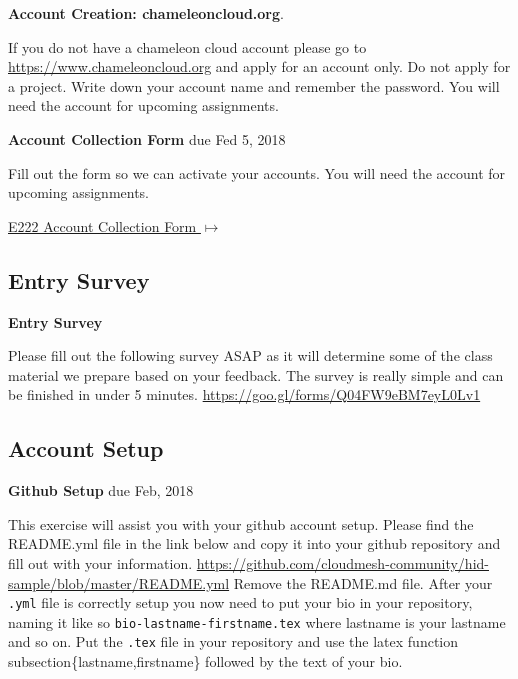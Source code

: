 \begin{exercise}
  {\bf Account Creation: chameleoncloud.org}. 
  
  If you do not have a chameleon cloud account please go to 
  \url{https://www.chameleoncloud.org} and apply for an
  account only. Do not apply for a project. Write down your account
  name and remember the password. You will need the account for
  upcoming assignments.
\end{exercise}

\begin{exercise}
   {\bf Account Collection Form } due Fed 5, 2018
 
 Fill out the form so we can activate your accounts. You will need the account for upcoming assignments.
 
  {\hfill \href{https://goo.gl/forms/W0MdgoJoY8F6Vt9Q2}{E222 Account Collection Form $\mapsto$}}
 
\end{exercise}

\subsection{Entry Survey}
\begin{exercise}
    {\bf Entry Survey}
    
 Please fill out the following survey ASAP as it will determine some of the class material we prepare based on your feedback. The survey is really simple and can be finished in under 5 minutes. \url{https://goo.gl/forms/Q04FW9eBM7eyL0Lv1}
\end{exercise}

\subsection{Account Setup}

\begin{exercise} {\bf Github Setup} due Feb, 2018

This exercise will assist you with your github account setup. Please
find the README.yml file in the link below and copy it into your
github repository and fill out with your
information. \url{https://github.com/cloudmesh-community/hid-sample/blob/master/README.yml}
Remove the README.md file. After your \verb|.yml| file is correctly setup you
now need to put your bio in your repository, naming it like so
\verb|bio-lastname-firstname.tex| where lastname is your lastname and so
on. Put the \verb|.tex| file in your repository and use the latex function
subsection\{lastname,firstname\} followed by the text of your bio.


\end{exercise}


